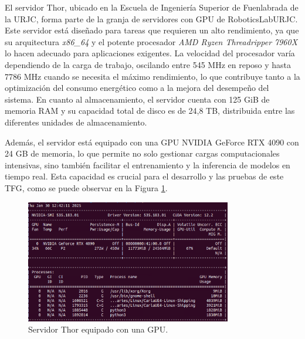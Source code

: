 El servidor Thor, ubicado en la Escuela de Ingeniería Superior de Fuenlabrada de la \ac{URJC}, forma parte de la granja de servidores con \ac{GPU} de RoboticsLabURJC. Este servidor está diseñado para tareas que requieren un alto rendimiento, ya que su arquitectura \textit{x86\_64} y el potente procesador \textit{AMD Ryzen Threadripper 7960X} lo hacen adecuado para aplicaciones exigentes. La velocidad del procesador varía dependiendo de la carga de trabajo, oscilando entre 545 MHz en reposo y hasta 7786 MHz cuando se necesita el máximo rendimiento, lo que contribuye tanto a la optimización del consumo energético como a la mejora del desempeño del sistema. En cuanto al almacenamiento, el servidor cuenta con 125 GiB de memoria \ac{RAM} y su capacidad total de disco es de 24,8 TB, distribuida entre las diferentes unidades de almacenamiento.

Además, el servidor está equipado con una \ac{GPU} NVIDIA GeForce RTX 4090 con 24 GB de memoria, lo que permite no solo gestionar cargas computacionales intensivas, sino también facilitar el entrenamiento y la inferencia de modelos en tiempo real. Esta capacidad es crucial para el desarrollo y las pruebas de este \ac{TFG}, como se puede observar en la Figura \ref{fig:thor_nvidia}.

\begin{figure}[ht]
  \centering
  \includegraphics[width=9cm]{figs/Plataformas_Desarollo/thor.png}
  \caption{Servidor Thor equipado con una \ac{GPU}.}
  \label{fig:thor_nvidia}
\end{figure}










